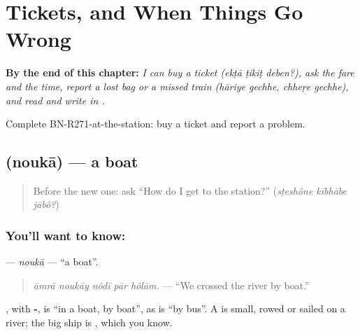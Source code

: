 
\chapter{Tickets, and When Things Go Wrong}
\label{ch:bn-tickets-and-when-things-go-wrong}

\begin{chapteropening}
\textbf{By the end of this chapter:} \emph{I can buy a ticket (ekṭā ṭikiṭ deben?), ask the fare and the time, report a lost bag or a missed train (hāriye gechhe, chheṛe gechhe), and read and write  in .}

Complete BN-R271-at-the-station: buy a ticket and report a problem.
\end{chapteropening}

\section[\texorpdfstring{\bn{নৌকা} (noukā)}{নৌকা (noukā)}]{ (noukā) — a boat}

\label{lesson:BN-C271-nouka}



\begin{quote}
Before the new one: ask \textquotedblleft{}How do I get to the station?\textquotedblright{} (\emph{sṭeshône kībhābe jābô?})
\end{quote}

\subsection*{You'll want to know: }
\textbf{} — \emph{noukā} — \textquotedblleft{}a boat\textquotedblright{}.

\begin{quote}
\textbf{    }
\end{quote}

\begin{quote}
\emph{āmrā noukāy nôdī pār hôlām.} — \textquotedblleft{}We crossed the river by boat.\textquotedblright{}
\end{quote}

\textbf{}, with \textbf{-}, is \textquotedblleft{}in a boat, by boat\textquotedblright{}, as \textbf{} is \textquotedblleft{}by bus\textquotedblright{}. A \textbf{} is small, rowed or sailed on a river; the big ship is \textbf{}, which you know.

